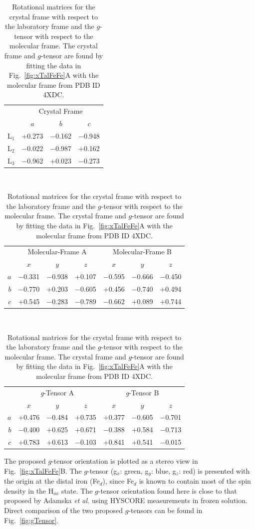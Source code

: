 \begin{table}[ht]
\caption[Rotational matrices for the crystal frame.]{Rotational matrices  for the crystal frame with respect to the laboratory frame and the $g$-tensor with respect to the molecular frame. The crystal frame and $g$-tensor are found by fitting the data in Fig.~\ref{fig:xTalFeFe}A with the molecular frame from PDB ID 4XDC.}
\centering
\hspace{-12.825em}
\begin{tabular}{r|ccc}
 & \multicolumn{3}{c}{Crystal Frame} \\
\multicolumn{1}{l|}{} & $a$ & $b$ & $c$ \\ \hline \hline
L$_1$ & $+$0.273 & $-$0.162 & $-$0.948 \\
L$_2$ & $-$0.022 & $-$0.987 & $+$0.162 \\
L$_3$ & $-$0.962 & $+$0.023 & $-$0.273
\end{tabular}\label{table:frames} \\
\vspace{0.5cm}
\begin{tabular}{r|ccc|ccc}
 & \multicolumn{3}{c|}{Molecular-Frame A} & \multicolumn{3}{c}{Molecular-Frame B} \\
 & $x$ & $y$ & $z$ & $x$ & $y$ & $z$ \\ \hline \hline
$a$ & $-$0.331 & $-$0.938 & +0.107 & $-$0.595 & $-$0.666 & $-$0.450 \\
$b$ & $-$0.770 & +0.203 & $-$0.605 & +0.456 & $-$0.740 & +0.494 \\
$c$ & +0.545 & $-$0.283 & $-$0.789 & $-$0.662 & +0.089 & +0.744
\end{tabular}\\
\vspace{0.5cm}
\begin{tabular}{r|ccc|ccc}
 & \multicolumn{3}{c|}{\textit{g}-Tensor A} & \multicolumn{3}{c}{\textit{g}-Tensor B} \\
 & $x$ & $y$ & $z$ & $x$ & $y$ & $z$ \\ \hline \hline
$a$ & $+$0.476 & $-$0.484 & $+$0.735 & $+$0.377 & $-$0.605 & $-$0.701 \\
$b$ & $-$0.400 & $+$0.625 & $+$0.671 & $-$0.388 & $+$0.584 & $-$0.713 \\
$c$ & $+$0.783 & $+$0.613 & $-$0.103 & $+$0.841 & $+$0.541 & $-$0.015
\end{tabular}
\end{table}

The proposed $g$-tensor orientation is plotted as a stereo view in Fig.~\ref{fig:xTalFeFe}B. The $g$-tensor (g$_x$: green, g$_y$: blue, g$_z$: red) is presented with the origin at the distal iron (Fe$_d$), since Fe$_d$ is known to contain most of the spin density in the H$_{ox}$ state. \cite{FiedlerDFT,GrecoDFT} The $g$-tensor orientation found here is close to that proposed by Adamska {\em et al.} using HYSCORE measurements in frozen solution. \cite{Adamska2015} Direct comparison of the two proposed $g$-tensors can be found in Fig.~\ref{fig:gTensor}. 

